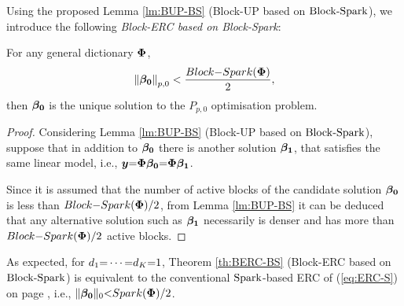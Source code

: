 Using the proposed Lemma \ref{lm:BUP-BS} (Block-UP based on $\mathrm{Block\text{{-}}Spark}$), we introduce the following \emph{Block-ERC based on Block-Spark}:
\begin{tcolorbox}
\begin{theorem}
\label{th:BERC-BS}
For any general dictionary $\boldsymbol{\Phi}$, 
\begin{equation*}
\left\lVert\boldsymbol{\beta_0}\right\rVert_{p,0} < \frac{Block{-}Spark(\boldsymbol{\Phi})}{2},
\end{equation*}
then $\boldsymbol{\beta_0}$ is the unique solution to the $P_{p,0}$ optimisation problem.
\end{theorem}
\end{tcolorbox}
\begin{proof}
Considering Lemma \ref{lm:BUP-BS} (Block-UP based on $\mathrm{Block\text{{-}}Spark}$), suppose that in addition to $\boldsymbol{\beta_0}$ there is another solution $\boldsymbol{\beta_1}$, that satisfies the same linear model, i.e., $\boldsymbol{y} {=} \boldsymbol{\Phi}\boldsymbol{\beta_0} {=} \boldsymbol{\Phi}\boldsymbol{\beta_1}$. 

Since it is assumed that the number of active blocks of the candidate solution $\boldsymbol{\beta_0}$ is less than $Block{-}Spark(\boldsymbol{\Phi})/2$, from Lemma \ref{lm:BUP-BS} it can be deduced that any alternative solution such as $\boldsymbol{\beta_1}$ necessarily is denser and has more than $Block{-}Spark(\boldsymbol{\Phi})/2$ active blocks.
\end{proof}

As expected, for $d_1 {=} \cdots {=} d_K {=} 1$, Theorem \ref{th:BERC-BS} (Block-ERC based on $\mathrm{Block\text{{-}}Spark}$) is equivalent to the conventional $\mathrm{Spark}$-based ERC of (\ref{eq:ERC-S}) on page \pageref{eq:ERC-S}, i.e., $\Vert \boldsymbol{\beta_0} \Vert_0 {<} Spark(\boldsymbol{\Phi})/2$.
